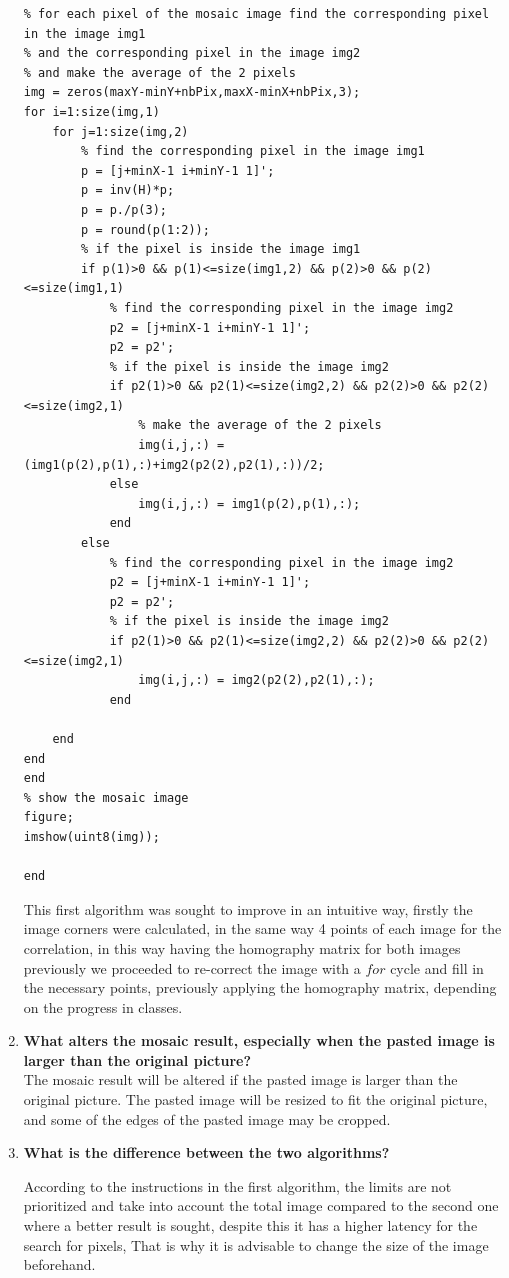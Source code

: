 \documentclass[12pt, twoside]{report}
\begin{document}
\begin{enumerate}
\begin{lstlisting}
% for each pixel of the mosaic image find the corresponding pixel in the image img1 
% and the corresponding pixel in the image img2
% and make the average of the 2 pixels
img = zeros(maxY-minY+nbPix,maxX-minX+nbPix,3);
for i=1:size(img,1)
    for j=1:size(img,2)
        % find the corresponding pixel in the image img1
        p = [j+minX-1 i+minY-1 1]';
        p = inv(H)*p;
        p = p./p(3);
        p = round(p(1:2));
        % if the pixel is inside the image img1
        if p(1)>0 && p(1)<=size(img1,2) && p(2)>0 && p(2)<=size(img1,1)
            % find the corresponding pixel in the image img2
            p2 = [j+minX-1 i+minY-1 1]';
            p2 = p2';
            % if the pixel is inside the image img2
            if p2(1)>0 && p2(1)<=size(img2,2) && p2(2)>0 && p2(2)<=size(img2,1)
                % make the average of the 2 pixels
                img(i,j,:) = (img1(p(2),p(1),:)+img2(p2(2),p2(1),:))/2;
            else
                img(i,j,:) = img1(p(2),p(1),:);
            end
        else
            % find the corresponding pixel in the image img2
            p2 = [j+minX-1 i+minY-1 1]';
            p2 = p2';
            % if the pixel is inside the image img2
            if p2(1)>0 && p2(1)<=size(img2,2) && p2(2)>0 && p2(2)<=size(img2,1)
                img(i,j,:) = img2(p2(2),p2(1),:);
            end
       
    end
end
end
% show the mosaic image
figure;
imshow(uint8(img));

end
\end{lstlisting}
This first algorithm was sought to improve in an intuitive way, firstly the image corners were calculated, in the same way 4 points of each image for the correlation, in this way having the homography matrix for both images previously we proceeded to re-correct the image with a $for$ cycle and fill in the necessary points, previously applying the homography matrix, depending on the progress in classes.

    \item \textbf{What alters the mosaic result, especially when the pasted image is larger than
the original picture?}\\
The mosaic result will be altered if the pasted image is larger than the original picture. The pasted image will be resized to fit the original picture, and some of the edges of the pasted image may be cropped.
    \item \textbf{What is the difference between the two algorithms?}

According to the instructions in the first algorithm, the limits are not prioritized and take into account the total image compared to the second one where a better result is sought, despite this it has a higher latency for the search for pixels, That is why it is advisable to change the size of the image beforehand.


\end{enumerate}
\end{document}
